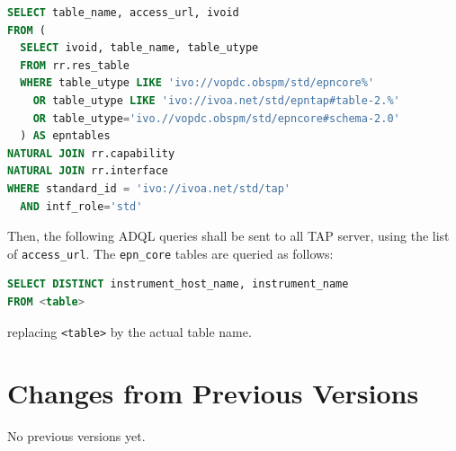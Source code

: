 \documentclass[11pt,a4paper]{ivoa}
\begin{document}
\begin{lstlisting}[language=SQL]
SELECT table_name, access_url, ivoid 
FROM ( 
  SELECT ivoid, table_name, table_utype 
  FROM rr.res_table 
  WHERE table_utype LIKE 'ivo://vopdc.obspm/std/epncore%' 
    OR table_utype LIKE 'ivo://ivoa.net/std/epntap#table-2.%' 
    OR table_utype='ivo.//vopdc.obspm/std/epncore#schema-2.0'
  ) AS epntables
NATURAL JOIN rr.capability
NATURAL JOIN rr.interface 
WHERE standard_id = 'ivo://ivoa.net/std/tap' 
  AND intf_role='std'
\end{lstlisting}

Then, the following ADQL queries shall be sent to all TAP server, 
using the list of \texttt{access\_url}. The \texttt{epn\_core} 
tables are queried as follows: 

\begin{lstlisting}[language=SQL]
SELECT DISTINCT instrument_host_name, instrument_name 
FROM <table>
\end{lstlisting}
replacing \texttt{<table>} by the actual table name.


\section{Changes from Previous Versions}

No previous versions yet.  



\end{document}
